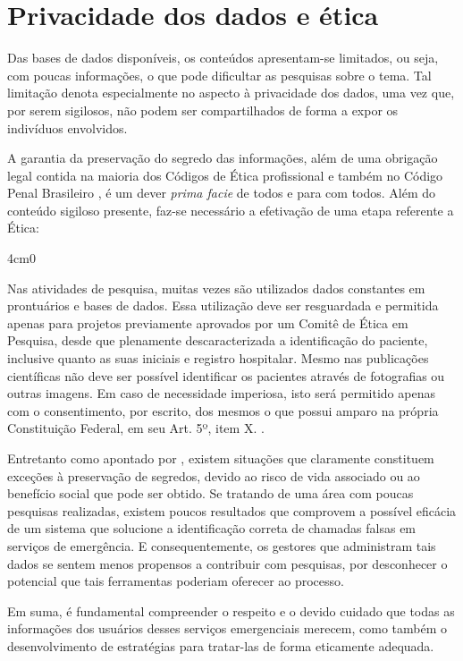 \section{Privacidade dos dados e ética}
Das bases de dados disponíveis, os conteúdos apresentam-se limitados, ou seja, com poucas informações, o que pode dificultar as pesquisas sobre o tema. Tal limitação denota  especialmente no aspecto à privacidade dos dados, uma vez que, por serem sigilosos, não podem ser compartilhados de forma a expor os indivíduos envolvidos.

A garantia da preservação do segredo das informações, além de uma obrigação legal contida na maioria dos Códigos de Ética profissional e também no Código Penal Brasileiro \citep{cp340}, é um dever \textit{prima facie} de todos e para com todos. Além do conteúdo sigiloso presente, faz-se necessário a efetivação de uma etapa referente a Ética:

\renewenvironment{quote}[1][1em]
  {\begin{adjustwidth}{#1}{0}}
  {\end{adjustwidth}}
\begin{quote}[4cm]
\begin{singlespace}
{\footnotesize  
Nas atividades de pesquisa, muitas vezes são utilizados dados constantes em prontuários e bases de dados. Essa utilização deve ser resguardada e permitida apenas para projetos previamente aprovados por um Comitê de Ética em Pesquisa, desde que plenamente descaracterizada a identificação do paciente, inclusive quanto as suas iniciais e registro hospitalar. Mesmo nas publicações científicas não deve ser possível identificar os pacientes através de fotografias ou outras imagens. Em caso de necessidade imperiosa, isto será permitido apenas com o consentimento, por escrito, dos mesmos o que possui amparo na própria Constituição Federal, em seu Art. 5º, item X. \citep{francisconi1998aspectos}.
}
\end{singlespace}
\end{quote}

Entretanto como apontado por \cite{francisconi1998aspectos}, existem situações que claramente constituem exceções à preservação de segredos, devido ao risco de vida associado ou ao benefício social que pode ser obtido. Se tratando de uma área com poucas pesquisas realizadas, existem poucos resultados que comprovem a possível eficácia de um sistema que solucione a identificação correta de chamadas falsas em serviços de emergência. E consequentemente, os gestores que administram tais dados se sentem menos propensos a contribuir com pesquisas, por desconhecer o potencial que tais ferramentas poderiam oferecer ao processo.

Em suma, é fundamental compreender o respeito e o devido cuidado que todas as informações dos usuários desses serviços emergenciais merecem, como também o desenvolvimento de estratégias para tratar-las de forma eticamente adequada.